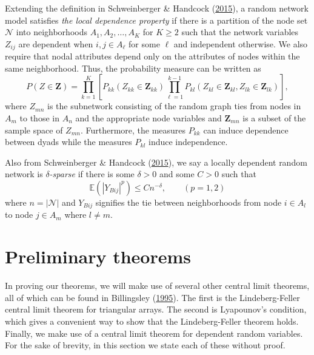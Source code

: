 \documentclass[12pt,twoside]{reedthesis}
\theoremstyle{definition}
\theoremstyle{definition}
\theoremstyle{remark}
\let\BeginKnitrBlock\begin \let\EndKnitrBlock\end
\begin{document}
\BeginKnitrBlock{definition}[Local dependence property]
\protect\hypertarget{def:unnamed-chunk-1}{}{\label{def:unnamed-chunk-1}
{} }Extending the definition in
Schweinberger \& Handcock
(\protect\hyperlink{ref-Schweinberger2015}{2015}), a random network
model satisfies \emph{the local dependence property} if there is a
partition of the node set \(\mathcal{N}\) into neighborhoods
\(A_1, A_2, \dots, A_K\) for \(K \geq 2\) such that the network
variables \(Z_{ij}\) are dependent when \(i, j \in A_{\ell}\) for some
\(\ell\) and independent otherwise. We also require that nodal
attributes depend only on the attributes of nodes within the same
neighborhood. Thus, the probability measure can be written as
\begin{equation}
    P(Z \in \mathbf{Z}) = \prod_{k = 1}^{K}\left[ P_{kk}(Z_{kk} \in \mathbf{Z}_{kk}) \prod_{\ell = 1}^{k-1} P_{kl}(Z_{kl} \in \mathbf{Z}_{kl}, Z_{lk} \in \mathbf{Z}_{lk}) \right],
  \end{equation}
where \(Z_{mn}\) is the subnetwork consisting of the random graph ties
from nodes in \(A_m\) to those in \(A_n\) and the appropriate node
variables and \(\mathbf{Z}_{mn}\) is a subset of the sample space of
\(Z_{mn}\). Furthermore, the measures \(P_{kk}\) can induce dependence
between dyads while the measures \(P_{kl}\) induce independence.
\EndKnitrBlock{definition}

\BeginKnitrBlock{definition}[Sparsity]
\protect\hypertarget{def:unnamed-chunk-2}{}{\label{def:unnamed-chunk-2}
{} }Also from Schweinberger \& Handcock
(\protect\hyperlink{ref-Schweinberger2015}{2015}), we say a locally
dependent random network is \emph{\(\delta\)-sparse} if there is some
\(\delta > 0\) and some \(C > 0\) such that
\begin{equation}
    \mathbb{E}\left( \left| Y_{Bij} \right|^{p} \right) \leq Cn^{-\delta}, \qquad (p = 1, 2)
  \end{equation}
where \(n = |\mathcal{N}|\) and \(Y_{Bij}\) signifies the tie between
neighborhoods from node \(i \in A_{l}\) to node \(j \in A_{m}\) where
\(l \neq m\).
\EndKnitrBlock{definition}

\section{Preliminary theorems}\label{preliminary-theorems}

In proving our theorems, we will make use of several other central limit
theorems, all of which can be found in Billingsley
(\protect\hyperlink{ref-Billingsley1995}{1995}). The first is the
Lindeberg-Feller central limit theorem for triangular arrays. The second
is Lyapounov's condition, which gives a convenient way to show that the
Lindeberg-Feller theorem holds. Finally, we make use of a central limit
theorem for dependent random variables. For the sake of brevity, in this
section we state each of these without proof.
\end{document}
